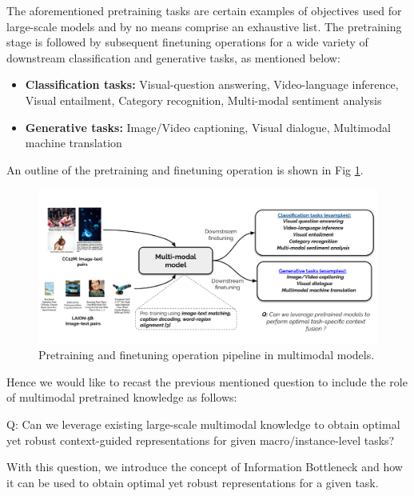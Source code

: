 The aforementioned pretraining tasks are certain examples of objectives used for large-scale models and by no means comprise an exhaustive list. The pretraining stage is followed by subsequent finetuning operations for a wide variety of downstream classification and generative tasks, as mentioned below:

\begin{itemize}

    \item \textbf{Classification tasks:} Visual-question answering, Video-language inference, Visual entailment, Category recognition, Multi-modal sentiment analysis
    \item \textbf{Generative tasks:} Image/Video captioning, Visual dialogue, Multimodal machine translation
    
\end{itemize}
 An outline of the pretraining and finetuning operation is shown in Fig \ref{multimodal pretraining}.

 \begin{figure}[h!]
    \centering
    \includegraphics[width=\textwidth]{figures/multimodal_pretraining.png}
    \caption{Pretraining and finetuning operation pipeline in multimodal models.}
    \label{multimodal pretraining}
 \end{figure}

Hence we would like to recast the previous mentioned question to include the role of multimodal pretrained knowledge as follows:

\begin{itshape}
Q: Can we leverage existing large-scale multimodal knowledge to obtain optimal yet robust context-guided representations for given macro/instance-level tasks?
\end{itshape}

With this question, we introduce the concept of Information Bottleneck and how it can be used to obtain optimal yet robust representations for a given task.

